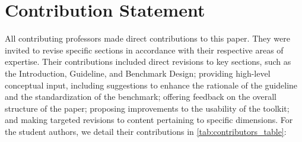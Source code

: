 \section*{Contribution Statement}

All contributing professors made direct contributions to this paper. They were invited to revise specific sections in accordance with their respective areas of expertise. Their contributions included direct revisions to key sections, such as the Introduction, Guideline, and Benchmark Design; providing high-level conceptual input, including suggestions to enhance the rationale of the guideline and the standardization of the benchmark; offering feedback on the overall structure of the paper; proposing improvements to the usability of the toolkit; and making targeted revisions to content pertaining to specific dimensions. For the student authors, we detail their contributions in \autoref{tab:contributors_table}:


